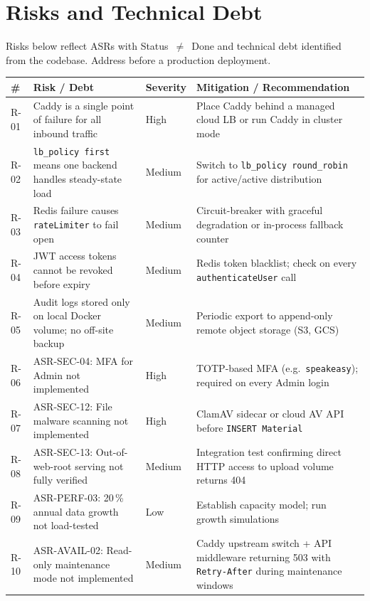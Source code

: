 \documentclass[12pt,a4paper]{article}
\begin{document}
\section{Risks and Technical Debt}
\label{sec:risks}

\begin{warnbox}
  Risks below reflect ASRs with Status~$\neq$~Done and technical debt identified from the
  codebase.  Address before a production deployment.
\end{warnbox}

\begin{longtable}{C{0.6cm} L{4.2cm} C{1.5cm} L{7.5cm}}
  \toprule
  \textbf{\#} & \textbf{Risk / Debt} & \textbf{Severity} & \textbf{Mitigation / Recommendation} \\
  \midrule \endhead \bottomrule \endlastfoot

  R-01 & Caddy is a single point of failure for all inbound traffic & High & Place Caddy behind a managed cloud LB or run Caddy in cluster mode \\
  R-02 & \texttt{lb\_policy first} means one backend handles steady-state load & Medium & Switch to \texttt{lb\_policy round\_robin} for active/active distribution \\
  R-03 & Redis failure causes \texttt{rateLimiter} to fail open & Medium & Circuit-breaker with graceful degradation or in-process fallback counter \\
  R-04 & JWT access tokens cannot be revoked before expiry & Medium & Redis token blacklist; check on every \texttt{authenticateUser} call \\
  R-05 & Audit logs stored only on local Docker volume; no off-site backup & Medium & Periodic export to append-only remote object storage (S3, GCS) \\
  R-06 & ASR-SEC-04: MFA for Admin not implemented & High & TOTP-based MFA (e.g.\ \texttt{speakeasy}); required on every Admin login \\
  R-07 & ASR-SEC-12: File malware scanning not implemented & High & ClamAV sidecar or cloud AV API before \texttt{INSERT Material} \\
  R-08 & ASR-SEC-13: Out-of-web-root serving not fully verified & Medium & Integration test confirming direct HTTP access to upload volume returns 404 \\
  R-09 & ASR-PERF-03: 20\,\% annual data growth not load-tested & Low & Establish capacity model; run growth simulations \\
  R-10 & ASR-AVAIL-02: Read-only maintenance mode not implemented & Medium & Caddy upstream switch + API middleware returning 503 with \texttt{Retry-After} during maintenance windows \\
\end{longtable}
\end{document}
